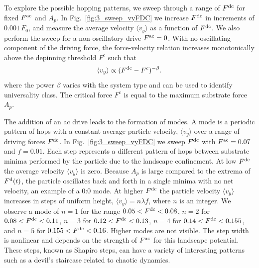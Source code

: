 \documentclass[preprint,showpacs,preprintnumbers,amsmath,amssymb,aps,prb]{revtex4-1}
\theoremstyle{remark}
\begin{document}
To explore the possible hopping patterns,
we sweep through a range of $F^{\rm dc}$ for fixed $F^{\rm ac}$ and $A_p$.
In Fig.~\ref{fig:3_sweep_vyFDC} 
we increase $F^{\rm dc}$ in increments of $0.001\,F_0$,
and 
measure the average velocity $\langle v_y \rangle $ 
as a function of $F^{\rm dc}$.
We also perform the sweep for a non-oscillatory drive $F^{\rm ac} = 0$.
With no oscillating component of the driving force,
  the force-velocity relation increases monotonically 
  above the depinning threshold $F^c$ such that
  \begin{equation}
    \langle v_y \rangle \propto (F^{\rm dc}-F^c)^{-\beta}.
  \end{equation}
  where the power $\beta$ varies with the
  system type and
  can be used to identify universality class. \cite{Reichhardt2017}
  The critical force $F^c$ is equal to the maximum substrate force
  $A_p$.
  
The addition of an ac drive leads
  to the formation of modes.
  A mode is a periodic pattern of hops
  with a constant average particle velocity, $\langle {v}_{y} \rangle$
  over a range of driving forces $F^{\rm dc}$.
  In Fig.~\ref{fig:3_sweep_vyFDC}
  we sweep $F^{\rm dc}$
  with $F^{\rm ac} = 0.07$ and $f=0.01$.
Each step represents a different pattern of hops
between substrate minima
performed by the particle
due to the landscape confinement.  
At 
low $F^{\rm dc}$ the average velocity $\langle v_y \rangle$ is zero.
Because 
$A_p$ is large compared to the extrema of $F^{\rm d}(t)$,
the particle oscillates back and forth
in a single minima with no net velocity, an example of 
a 0:0 mode.
At higher $F^{\rm dc}$ the particle velocity 
$\langle v_{y} \rangle$ increases in steps of uniform height,
$\langle v_{y} \rangle = n \lambda f$,
where $n$ is an integer.
We observe a mode of $n=1$
for the range $0.05 < F^{\rm dc} < 0.08$,
$n=2$ for $0.08 < F^{\rm dc} < 0.11$,
$n=3$ for $0.12 < F^{\rm dc} < 0.13$,
$n=4$ for $0.14 < F^{\rm dc} < 0.155$, and 
$n=5$ for $0.155 < F^{\rm dc} < 0.16$.
Higher modes are not visible.
The step width is nonlinear
and depends on the strength of $F^{\rm ac}$
for this landscape potential.\cite{Reichhardt2000,Juniper2017}
These steps, known as Shapiro steps, can have a variety of
interesting patterns
such as a devil's staircase related to chaotic dynamics.\cite{Bak1986}
\end{document}
